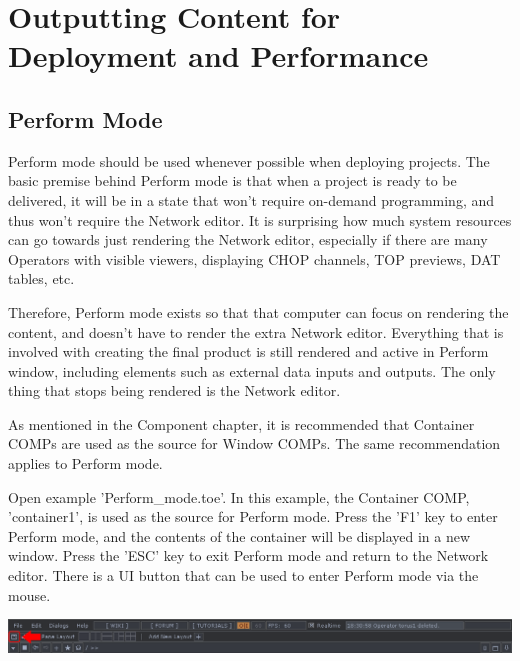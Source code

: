 \cleardoublepage
\chapter{Outputting Content for Deployment and Performance}
\label{ch:10}


\section{Perform Mode}

\begin{fullwidth}
Perform mode should be used whenever possible when deploying projects. The basic premise behind Perform mode is that when a project is ready to be delivered, it will be in a state that won't require on-demand programming, and thus won't require the Network editor. It is surprising how much system resources can go towards just rendering the Network editor, especially if there are many Operators with visible viewers, displaying CHOP channels, TOP previews, DAT tables, etc.

Therefore, Perform mode exists so that that computer can focus on rendering the content, and doesn't have to render the extra Network editor. Everything that is involved with creating the final product is still rendered and active in Perform window, including elements such as external data inputs and outputs. The only thing that stops being rendered is the Network editor.

As mentioned in the Component chapter, it is recommended that Container COMPs are used as the source for Window COMPs. The same recommendation applies to Perform mode.

Open example 'Perform\_mode.toe'. In this example, the Container COMP, 'container1', is used as the source for Perform mode. Press the 'F1' key to enter Perform mode, and the contents of the container will be displayed in a new window. Press the 'ESC' key to exit Perform mode and return to the Network editor. There is a UI button that can be used to enter Perform mode via the mouse.

\begin{center}
\includegraphics{./img/10.1/perform.png}
\end{center}

\end{fullwidth}

